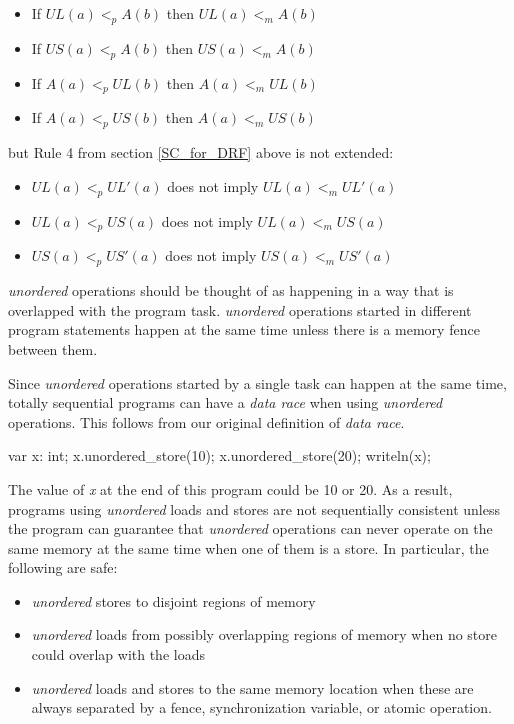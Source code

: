 \begin{itemize}
  \item If $UL(a)<_pA(b)$ then $UL(a)<_mA(b)$
  \item If $US(a)<_pA(b)$ then $US(a)<_mA(b)$
  \item If $A(a)<_pUL(b)$ then $A(a)<_mUL(b)$
  \item If $A(a)<_pUS(b)$ then $A(a)<_mUS(b)$
\end{itemize}

but Rule 4 from section \ref{SC_for_DRF} above is not extended:

\begin{itemize}
  \item $UL(a) <_p UL'(a)$ does not imply $UL(a) <_m UL'(a)$
  \item $UL(a) <_p US(a)$ does not imply $UL(a) <_m US(a)$
  \item $US(a) <_p US'(a)$ does not imply $US(a) <_m US'(a)$
\end{itemize}

\textit{unordered} operations should be thought of as happening in a way that
is overlapped with the program task. \textit{unordered} operations started in
different program statements happen at the same time unless there is a memory
fence between them.

Since \textit{unordered} operations started by a single task can happen at
the same time, totally sequential programs can have a \textit{data race}
when using \textit{unordered} operations. This follows from our original
definition of \textit{data race}.

\begin{chapel}
var x: int;
x.unordered_store(10);
x.unordered_store(20);
writeln(x);
\end{chapel}

The value of \textit{x} at the end of this program could be 10 or 20. As a
result, programs using \textit{unordered} loads and stores are not sequentially
consistent unless the program can guarantee that \textit{unordered} operations
can never operate on the same memory at the same time when one of them is a
store. In particular, the following are safe:

\begin{itemize}
  \item \textit{unordered} stores to disjoint regions of memory
  \item \textit{unordered} loads from possibly overlapping regions of memory when no store could overlap with the loads
  \item \textit{unordered} loads and stores to the same memory location
  when these are always separated by a fence, synchronization variable, or
  atomic operation.
\end{itemize}

